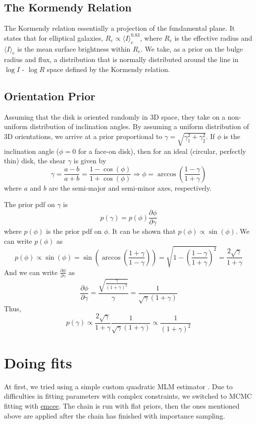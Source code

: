 \documentclass{article}
\begin{document}
\subsection{The Kormendy Relation}
The Kormendy relation essentially a projection of the fundamental
plane.  It states that for elliptical galaxies,
$R_e \propto \langle I \rangle_e^{0.83}$, where $R_e$ is the effective radius
and $\langle I \rangle_e$ is the mean surface brightness within $R_e$.
We take, as a prior on the bulge radius and flux, a
distribution that is normally distributed around the line in $\log I$
- $\log R$ space defined by the Kormendy relation.

\subsection{Orientation Prior}
Assuming that the disk is oriented randomly in 3D space,
they take on a non-uniform distribution of inclination angles.  By
assuming a uniform distribution of 3D orientations, we arrive at a
 prior proportional to $\gamma = \sqrt{\gamma_1^2 + \gamma_2^2}$.
If $\phi$ is the inclination angle ($\phi = 0$ for a face-on disk), then for an ideal
(circular, perfectly thin) disk, the shear $\gamma$ is given by
\[
\gamma = \frac{a - b}{a + b} = \frac{1 - \cos(\phi)}{1 + \cos(\phi)}
\Rightarrow \phi = \arccos{\left( \frac{1 - \gamma}{1 + \gamma} \right) }
\]
where $a$ and $b$ are the semi-major and semi-minor axes, respectively.

The prior pdf on $\gamma$ is
\[
p(\gamma) = p(\phi) \frac{\partial \phi}{\partial \gamma}
\]
where $p(\phi)$ is the prior pdf on $\phi$. It can be shown that
$p(\phi) \propto \sin (\phi)$.  We can write $p(\phi)$ as
\[
p(\phi) \propto \sin(\phi)
= \sin \left( \arccos \left( \frac{1 + \gamma}{1 - \gamma} \right) \right)
= \sqrt{1 - \left( \frac{1 - \gamma}{1 + \gamma} \right)^2}
= \frac{2 \sqrt{\gamma}}{1 + \gamma}
\]
And we can write $\frac{\partial \phi}{\partial \gamma}$ as
\[
\frac{\partial \phi}{\partial \gamma}
= \frac{\sqrt{\frac{\gamma}{(1 + \gamma)^2}}}{\gamma}
= \frac{1}{\sqrt{\gamma} (1 + \gamma)}
\]
Thus,
\[
p(\gamma) \propto \frac{2 \sqrt{\gamma}}{1 + \gamma} \frac{1}{\sqrt{\gamma} (1 + \gamma)}
\propto \frac{1}{(1 + \gamma)^2}
\]


\section{Doing fits}
At first, we tried using a simple custom quadratic MLM estimator
.  Due to difficulties in
fitting parameters with complex constraints, we switched to MCMC
fitting with \href{http://dan.iel.fm/emcee/current/}{emcee}.  The
chain is run with flat priors, then the ones mentioned above are
applied after the chain has finished with importance sampling.
\end{document}

